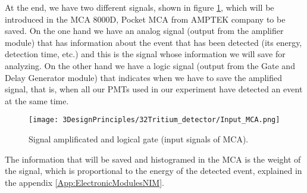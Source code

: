 At the end, we have two different signals, shown in figure \ref{fig:InputSignalsMCA}, which will be introduced in the MCA 8000D, Pocket MCA from AMPTEK company \cite{DataSheetMCA} to be saved. On the one hand we have an analog signal (output from the amplifier module) that has information about the event that has been detected (its energy, detection time, etc.) and this is the signal whose information we will save for analyzing. On the other hand we have a logic signal (output from the Gate and Delay Generator module) that indicates when we have to save the amplified signal, that is, when all our PMTs used in our experiment have detected an event at the same time.

\begin{figure}[htbp]
\centering
\texttt{[image: 3DesignPrinciples/32Tritium\_detector/Input\_MCA.png]}
\caption{Signal amplificated and logical gate (input signals of MCA).\label{fig:InputSignalsMCA}}
\end{figure}


The information that will be saved and histogramed in the MCA is the weight of the signal, which is proportional to the energy of the detected event, explained in the appendix \ref{App:ElectronicModulesNIM}. %

